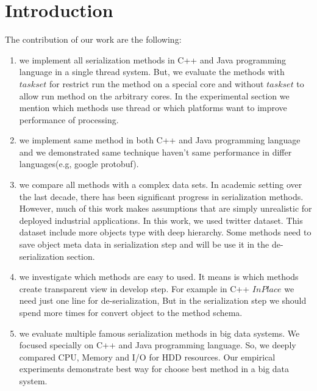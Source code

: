 \section{Introduction}
The contribution of our work are the following:
\begin{enumerate}
	\item we implement all serialization methods in C++ and Java programming language in a single thread system. But, we evaluate the methods with $task set$ for restrict run the method on a special core and without $task set$ to allow run method on the arbitrary cores. In the experimental section we mention which methods use thread or which platforms want to improve performance of processing.
	
	\item we implement same method in both C++ and Java programming language and we demonstrated same technique haven't same performance in differ languages(e.g, google protobuf).
	
	\item we compare all methods with a complex data sets. In academic setting over the last decade, there has been significant progress in serialization methods. However, much of this work makes assumptions that are simply unrealistic for deployed industrial applications. In this work, we used twitter dataset. This dataset include more objects type with deep hierarchy. Some methods need to save object meta data in serialization step and will be use it in the de-serialization section.    
	
	\item we investigate which methods are easy to used. It means is which methods create transparent view in develop step. For example in C++ $InPlace$ we need just one line for de-serialization, But in the serialization step we should spend more times for convert object to the method schema.
	
		
	\item we evaluate multiple famous serialization methods in big data systems. We focused specially on C++ and Java programming language. So, we deeply compared CPU, Memory and I/O for HDD resources. Our empirical experiments demonstrate best way for choose best method in a big data system.
	
	
\end{enumerate}